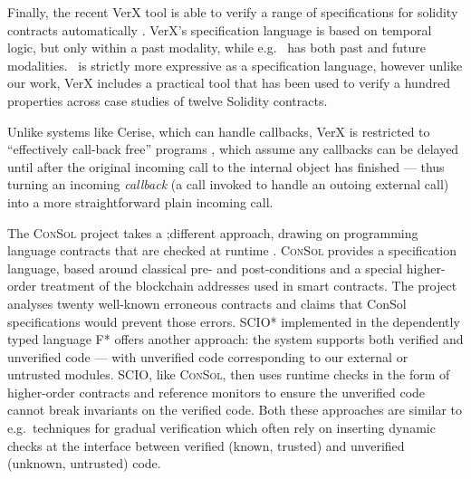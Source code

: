 



Finally, the recent VerX tool is able to verify a range of
specifications for solidity contracts automatically \cite{VerX}.
VerX's specification language is based on
temporal logic, 
but only within a past modality, while e.g.\ \citet{OOPSLA22} has both past
and future modalities.
\Chainmail\ is strictly more expressive as a
specification language,
%
however unlike
%
our work, VerX includes a practical tool that has
been used to verify   a hundred properties across case studies of
twelve Solidity contracts.
 


Unlike systems like Cerise, which can handle callbacks, VerX
is restricted to ``effectively call-back free'' programs
\cite{Grossman,Albert,relaxed-callbacks-ToDES}, which assume any callbacks can be delayed until after the
original incoming call to the internal object has finished 
--- thus turning an incoming \textit{callback} (a call invoked 
to handle an outoing external call) into a more straightforward plain
incoming call. 


The \textsc{ConSol} project \cite{consolidating-pldi2024} takes a
;different approach, drawing on programming language contracts that are
checked at runtime \cite{FinFel01}. \textsc{ConSol} provides a
specification language, based around classical pre- and post-conditions and
a special higher-order treatment of the blockchain addresses used in
smart contracts. The project analyses twenty well-known erroneous
contracts and claims that ConSol specifications would prevent those
errors.
SCIO* \cite{secure-io-fstar-popl2024} implemented in the dependently
typed language F* offers another approach: the system supports both
verified and unverified code --- with unverified code 
corresponding to our external or untrusted modules.  SCIO,
like \textsc{ConSol}, then uses runtime checks in the form of
higher-order contracts and reference monitors to ensure the unverified
code cannot break invariants on the verified code. Both these
approaches are similar to e.g.\  techniques for gradual
verification \cite{gradual-verification-popl2024,Cok2022} which often
rely on inserting dynamic checks at the interface between verified
(known, trusted) and unverified (unknown, untrusted) code.



